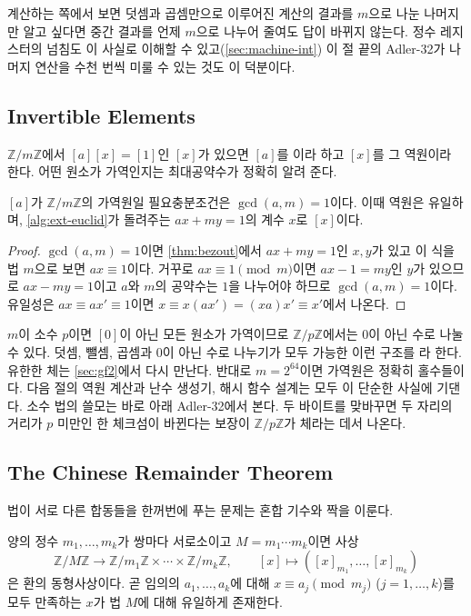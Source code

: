 계산하는 쪽에서 보면 덧셈과 곱셈만으로 이루어진 계산의 결과를 $m$으로 나눈 나머지만 알고 싶다면 중간 결과를 언제 $m$으로 나누어 줄여도 답이 바뀌지 않는다. 정수 레지스터의 넘침도 이 사실로 이해할 수 있고(\cref{sec:machine-int}) 이 절 끝의 Adler-32가 나머지 연산을 수천 번씩 미룰 수 있는 것도 이 덕분이다.

\subsection{Invertible Elements}

$\mathbb{Z}/m\mathbb{Z}$에서 $[a][x]=[1]$인 $[x]$가 있으면 $[a]$를 이라 하고 $[x]$를 그 역원이라 한다. 어떤 원소가 가역인지는 최대공약수가 정확히 알려 준다.

\begin{theorem}
\label{thm:unit}
$[a]$가 $\mathbb{Z}/m\mathbb{Z}$의 가역원일 필요충분조건은 $\gcd(a,m)=1$이다. 이때 역원은 유일하며, \cref{alg:ext-euclid}가 돌려주는 $ax+my=1$의 계수 $x$로 $[x]$이다.
\end{theorem}

\begin{proof}
$\gcd(a,m)=1$이면 \cref{thm:bezout}에서 $ax+my=1$인 $x,y$가 있고 이 식을 법 $m$으로 보면 $ax\equiv1$이다. 거꾸로 $ax\equiv1\pmod m$이면 $ax-1=my$인 $y$가 있으므로 $ax-my=1$이고 $a$와 $m$의 공약수는 $1$을 나누어야 하므로 $\gcd(a,m)=1$이다. 유일성은 $ax\equiv ax'\equiv1$이면 $x\equiv x(ax')=(xa)x'\equiv x'$에서 나온다.
\end{proof}

$m$이 소수 $p$이면 $[0]$이 아닌 모든 원소가 가역이므로 $\mathbb{Z}/p\mathbb{Z}$에서는 $0$이 아닌 수로 나눌 수 있다. 덧셈, 뺄셈, 곱셈과 $0$이 아닌 수로 나누기가 모두 가능한 이런 구조를 라 한다. 유한한 체는 \cref{sec:gf2}에서 다시 만난다. 반대로 $m=2^{64}$이면 가역원은 정확히 홀수들이다. 다음 절의 역원 계산과 난수 생성기, 해시 함수 설계는 모두 이 단순한 사실에 기댄다. 소수 법의 쓸모는 바로 아래 Adler-32에서 본다. 두 바이트를 맞바꾸면 두 자리의 거리가 $p$ 미만인 한 체크섬이 바뀐다는 보장이 $\mathbb{Z}/p\mathbb{Z}$가 체라는 데서 나온다.

\subsection{The Chinese Remainder Theorem}

법이 서로 다른 합동들을 한꺼번에 푸는 문제는 혼합 기수와 짝을 이룬다.

\begin{theorem}
\label{thm:crt}
양의 정수 $m_1,\dots,m_k$가 쌍마다 서로소이고 $M=m_1\cdots m_k$이면 사상
\[
\mathbb{Z}/M\mathbb{Z}\to\mathbb{Z}/m_1\mathbb{Z}\times\cdots\times\mathbb{Z}/m_k\mathbb{Z},\qquad[x]\mapsto([x]_{m_1},\dots,[x]_{m_k})
\]
은 환의 동형사상이다. 곧 임의의 $a_1,\dots,a_k$에 대해 $x\equiv a_j\pmod{m_j}$ ($j=1,\dots,k$)를 모두 만족하는 $x$가 법 $M$에 대해 유일하게 존재한다.
\end{theorem}

